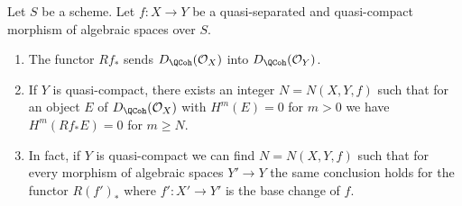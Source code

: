 \begin{lemma}
\label{lemma-quasi-coherence-direct-image}
Let $S$ be a scheme. Let $f : X \to Y$ be a quasi-separated and quasi-compact
morphism of algebraic spaces over $S$.
\begin{enumerate}
\item The functor $Rf_*$ sends $D_\QCoh(\mathcal{O}_X)$
into $D_\QCoh(\mathcal{O}_Y)$.
\item If $Y$ is quasi-compact, there exists an integer $N = N(X, Y, f)$
such that for an object $E$ of $D_\QCoh(\mathcal{O}_X)$
with $H^m(E) = 0$ for $m > 0$ we have
$H^m(Rf_*E) = 0$ for $m \geq N$.
\item In fact, if $Y$ is quasi-compact we can find $N = N(X, Y, f)$
such that for every morphism of algebraic spaces $Y' \to Y$
the same conclusion holds for the functor $R(f')_*$
where $f' : X' \to Y'$ is the base change of $f$.
\end{enumerate}
\end{lemma}

